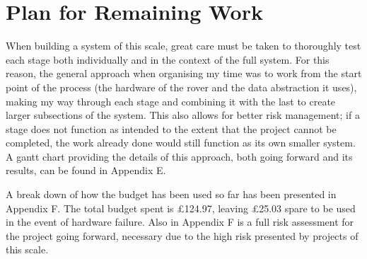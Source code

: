 \chapter{Plan for Remaining Work}

When building a system of this scale, great care must be taken to thoroughly test each stage both individually and in the context of the full system. For this reason, the general approach when organising my time was to work from the start point of the process (the hardware of the rover and the data abstraction it uses), making my way through each stage and combining it with the last to create larger subsections of the system. This also allows for better risk management; if a stage does not function as intended to the extent that the project cannot be completed, the work already done would still function as its own smaller system. A gantt chart providing the details of this approach, both going forward and its results, can be found in Appendix E.

A break down of how the budget has been used so far has been presented in Appendix F. The total budget spent is \pounds124.97, leaving \pounds25.03 spare to be used in the event of hardware failure. Also in Appendix F is a full risk assessment for the project going forward, necessary due to the high risk presented by projects of this scale.